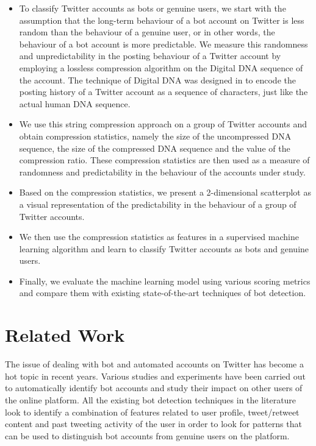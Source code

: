 \documentclass{llncs}
\begin{document}
\begin{itemize}

\item To classify Twitter accounts as bots or genuine users, we start with the assumption that the long-term behaviour of a bot account on Twitter is less random than the behaviour of a genuine user, or in other words, the behaviour of a bot account is more predictable. We measure this randomness and unpredictability in the posting behaviour of a Twitter account by employing a lossless compression algorithm on the Digital DNA sequence of the account. The technique of Digital DNA was designed in \cite{7876716} to encode the posting history of a Twitter account as a sequence of characters, just like the actual human DNA sequence. 

\item We use this string compression approach on a group of Twitter accounts and obtain compression statistics, namely the size of the uncompressed DNA sequence, the size of the compressed DNA sequence and the value of the compression ratio. These compression statistics are then used as a measure of randomness and predictability in the behaviour of the accounts under study.

\item Based on the compression statistics, we present a 2-dimensional scatterplot as a visual representation of the predictability in the behaviour of a group of Twitter accounts.

\item We then use the compression statistics as features in a supervised machine learning algorithm and learn to classify Twitter accounts as bots and genuine users.

\item Finally, we evaluate the machine learning model using various scoring metrics and compare them with existing state-of-the-art techniques of bot detection.

\end{itemize}

\section{Related Work}

The issue of dealing with bot and automated accounts on Twitter has become a hot topic in recent years. Various studies and experiments have been carried out to automatically identify bot accounts and study their impact on other users of the online platform. All the existing bot detection techniques in the literature look to identify a combination of features related to user profile, tweet/retweet content and past tweeting activity of the user in order to look for patterns that can be used to distinguish bot accounts from genuine users on the platform.
\end{document}
